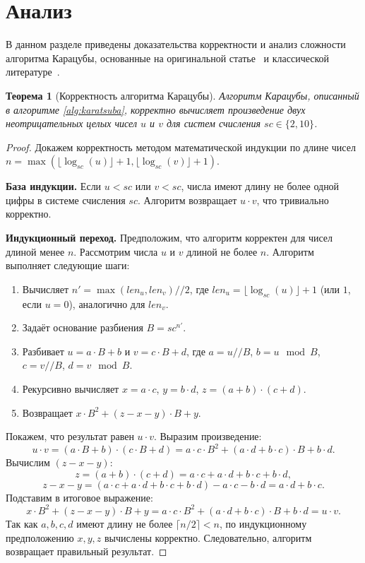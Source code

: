 \documentclass[11pt]{article}
\newtheorem{theorem}{Теорема}
\begin{document}
\section{Анализ}
В данном разделе приведены доказательства корректности и анализ сложности алгоритма Карацубы, основанные на оригинальной статье~\cite{karatsuba1962} и классической литературе~\cite{knuth1997}.

\begin{theorem}[Корректность алгоритма Карацубы]
\label{thm:correctness}
Алгоритм Карацубы, описанный в алгоритме \ref{alg:karatsuba}, корректно вычисляет произведение двух неотрицательных целых чисел $u$ и $v$ для систем счисления $sc \in \{2, 10\}$.
\end{theorem}

\begin{proof}
Докажем корректность методом математической индукции по длине чисел $n = \max(\lfloor \log_{sc}(u) \rfloor + 1, \lfloor \log_{sc}(v) \rfloor + 1)$.

\textbf{База индукции.} Если $u < sc$ или $v < sc$, числа имеют длину не более одной цифры в системе счисления $sc$. Алгоритм возвращает $u \cdot v$, что тривиально корректно.

\textbf{Индукционный переход.} Предположим, что алгоритм корректен для чисел длиной менее $n$. Рассмотрим числа $u$ и $v$ длиной не более $n$. Алгоритм выполняет следующие шаги:
\begin{enumerate}
    \item Вычисляет $n' = \max(len_u, len_v) // 2$, где $len_u = \lfloor \log_{sc}(u) \rfloor + 1$ (или $1$, если $u = 0$), аналогично для $len_v$.
    \item Задаёт основание разбиения $B = sc^{n'}$.
    \item Разбивает $u = a \cdot B + b$ и $v = c \cdot B + d$, где $a = u // B$, $b = u \mod B$, $c = v // B$, $d = v \mod B$.
    \item Рекурсивно вычисляет $x = a \cdot c$, $y = b \cdot d$, $z = (a + b) \cdot (c + d)$.
    \item Возвращает $x \cdot B^2 + (z - x - y) \cdot B + y$.
\end{enumerate}

Покажем, что результат равен $u \cdot v$. Выразим произведение:
\[
u \cdot v = (a \cdot B + b) \cdot (c \cdot B + d) = a \cdot c \cdot B^2 + (a \cdot d + b \cdot c) \cdot B + b \cdot d.
\]
Вычислим $(z - x - y)$:
\[
z = (a + b) \cdot (c + d) = a \cdot c + a \cdot d + b \cdot c + b \cdot d,
\]
\[
z - x - y = (a \cdot c + a \cdot d + b \cdot c + b \cdot d) - a \cdot c - b \cdot d = a \cdot d + b \cdot c.
\]
Подставим в итоговое выражение:
\[
x \cdot B^2 + (z - x - y) \cdot B + y = a \cdot c \cdot B^2 + (a \cdot d + b \cdot c) \cdot B + b \cdot d = u \cdot v.
\]
Так как $a, b, c, d$ имеют длину не более $\lceil n/2 \rceil < n$, по индукционному предположению $x, y, z$ вычислены корректно. Следовательно, алгоритм возвращает правильный результат.
\end{proof}
\end{document}
